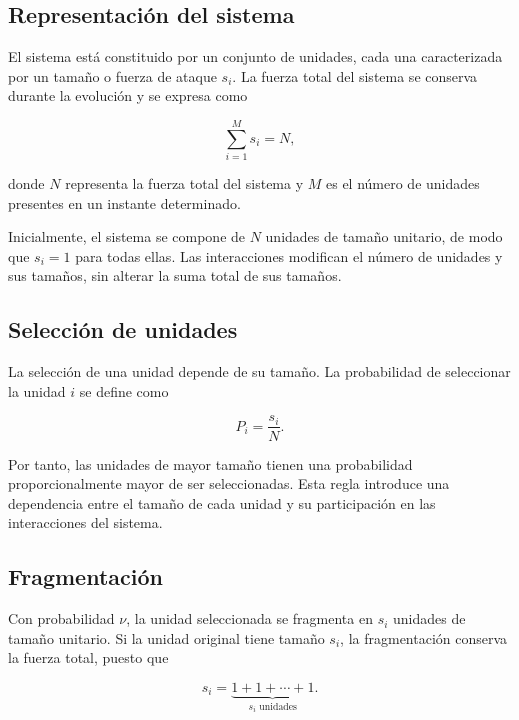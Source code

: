 \documentclass[
a4paper,
amsfonts,
amssymb,
amsmath,
reprint,
twoside
]{revtex4-1}
\begin{document}
\subsection{Representación del sistema}

El sistema está constituido por un conjunto de unidades, cada una
caracterizada por un tamaño o fuerza de ataque $s_i$. La fuerza total
del sistema se conserva durante la evolución y se expresa como

\begin{equation}
    \sum_{i=1}^{M}s_i=N,
    \label{eq:conservacion}
\end{equation}

donde $N$ representa la fuerza total del sistema y $M$ es el número
de unidades presentes en un instante determinado.

Inicialmente, el sistema se compone de $N$ unidades de tamaño
unitario, de modo que $s_i=1$ para todas ellas. Las interacciones
modifican el número de unidades y sus tamaños, sin alterar la suma
total de sus tamaños.

\subsection{Selección de unidades}

La selección de una unidad depende de su tamaño. La probabilidad
de seleccionar la unidad $i$ se define como

\begin{equation}
    P_i=\frac{s_i}{N}.
    \label{eq:seleccion}
\end{equation}

Por tanto, las unidades de mayor tamaño tienen una probabilidad
proporcionalmente mayor de ser seleccionadas. Esta regla introduce
una dependencia entre el tamaño de cada unidad y su participación
en las interacciones del sistema.

\subsection{Fragmentación}

Con probabilidad $\nu$, la unidad seleccionada se fragmenta en
$s_i$ unidades de tamaño unitario. Si la unidad original tiene
tamaño $s_i$, la fragmentación conserva la fuerza total, puesto que

\begin{equation}
    s_i=\underbrace{1+1+\cdots+1}_{s_i\text{ unidades}}.
\end{equation}
\end{document}
